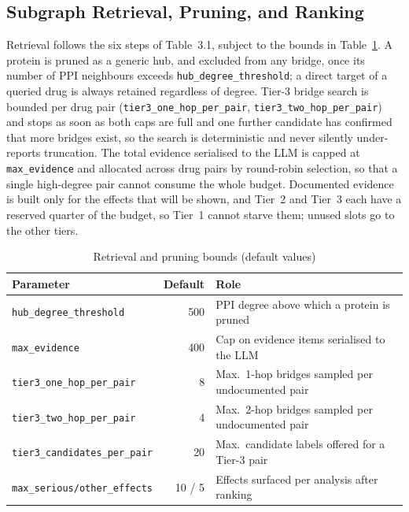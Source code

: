 \documentclass[11pt]{report}
\begin{document}
\subsection{Subgraph Retrieval, Pruning, and Ranking}
\label{sec:retrieval-impl}

Retrieval follows the six steps of Table~3.1, subject to the bounds in
Table~\ref{tab:bounds}. A protein is pruned as a generic hub, and excluded
from any bridge, once its number of PPI neighbours exceeds
\texttt{hub\_degree\_threshold}; a direct target of a queried drug is always
retained regardless of degree. Tier-3 bridge search is bounded per drug
pair (\texttt{tier3\_one\_hop\_per\_pair}, \texttt{tier3\_two\_hop\_per\_pair})
and stops as soon as both caps are full and one further candidate has
confirmed that more bridges exist, so the search is deterministic and never
silently under-reports truncation. The total evidence serialised to the LLM
is capped at \texttt{max\_evidence} and allocated across drug pairs by
round-robin selection, so that a single high-degree pair cannot consume the
whole budget. Documented evidence is built only for the effects that will be
shown, and Tier~2 and Tier~3 each have a reserved quarter of the budget, so
Tier~1 cannot starve them; unused slots go to the other tiers.

\begin{table}[t]
  \caption{Retrieval and pruning bounds (default values)}
  \label{tab:bounds}
  \centering
  \begin{tabular}{@{}lrl@{}}
    \toprule
    Parameter & Default & Role \\
    \midrule
    \texttt{hub\_degree\_threshold}      & 500 & PPI degree above which a protein is pruned \\
    \texttt{max\_evidence}               & 400 & Cap on evidence items serialised to the LLM \\
    \texttt{tier3\_one\_hop\_per\_pair}  & 8   & Max.\ 1-hop bridges sampled per undocumented pair \\
    \texttt{tier3\_two\_hop\_per\_pair}  & 4   & Max.\ 2-hop bridges sampled per undocumented pair \\
    \texttt{tier3\_candidates\_per\_pair}& 20  & Max.\ candidate labels offered for a Tier-3 pair \\
    \texttt{max\_serious/other\_effects} & 10 / 5 & Effects surfaced per analysis after ranking \\
    \bottomrule
  \end{tabular}
\end{table}
\end{document}
